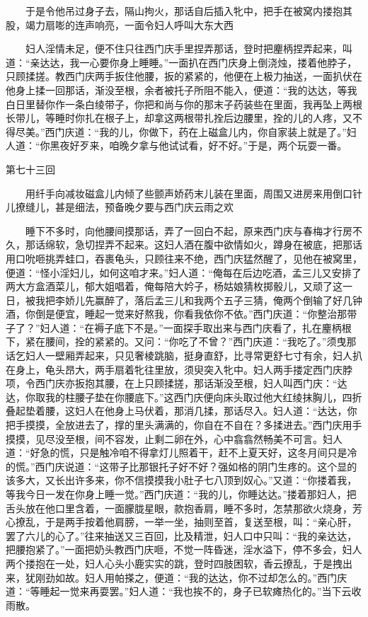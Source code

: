 　　于是令他吊过身子去，隔山拘火，那话自后插入牝中，把手在被窝内搂抱其股，竭力扇嘭的连声响亮，一面令妇人呼叫大东大西


　　妇人淫情未足，便不住只往西门庆手里捏弄那话，登时把麈柄捏弄起来，叫道：“亲达达，我一心要你身上睡睡。”一面扒在西门庆身上倒浇烛，搂着他脖子，只顾揉搓。教西门庆两手扳住他腰，扳的紧紧的，他便在上极力抽送，一面扒伏在他身上揉一回那话，渐没至根，余者被托子所阻不能入，便道：“我的达达，等我白日里替你作一条白绫带子，你把和尚与你的那末子药装些在里面，我再坠上两根长带儿，等睡时你扎在根子上，却拿这两根带扎拴后边腰里，拴的儿的人疼，又不得尽美。”西门庆道：“我的儿，你做下，药在上磁盒儿内，你自家装上就是了。”妇人道：“你黑夜好歹来，咱晚夕拿与他试试看，好不好。”于是，两个玩耍一番。


第七十三回

　　用纤手向减妆磁盒儿内倾了些颤声娇药末儿装在里面，周围又进房来用倒口针儿撩缝儿，甚是细法，预备晚夕要与西门庆云雨之欢


　　睡下不多时，向他腰间摸那话，弄了一回白不起，原来西门庆与春梅才行房不久，那话绵软，急切捏弄不起来。这妇人酒在腹中欲情如火，蹲身在被底，把那话用口吮咂挑弄蛙口，吞裹龟头，只顾往来不绝，西门庆猛然醒了，见他在被窝里，便道：“怪小淫妇儿，如何这咱才来。”妇人道：“俺每在后边吃酒，孟三儿又安排了两大方盒酒菜儿，郁大姐唱着，俺每陪大妗子，杨姑娘猜枚掷骰儿，又顽了这一日，被我把李娇儿先赢醉了，落后孟三儿和我两个五子三猜，俺两个倒输了好几钟酒，你倒是便宜，睡起一觉来好熬我，你看我依你不依。”西门庆道：“你整治那带子了？”妇人道：“在褥子底下不是。”一面探手取出来与西门庆看了，扎在麈柄根下，紧在腰间，拴的紧紧的。又问：“你吃了不曾？”西门庆道：“我吃了。”须曳那话乞妇人一壁厢弄起来，只见奢棱跳脑，挺身直舒，比寻常更舒七寸有余，妇人扒在身上，龟头昂大，两手扇着牝往里放，须臾突入牝中。妇人两手搂定西门庆脖项，令西门庆亦扳抱其腰，在上只顾揉搓，那话渐没至根，妇人叫西门庆：“达达，你取我的柱腰子垫在你腰底下。”这西门庆便向床头取过他大红绫抹胸儿，四折叠起垫着腰，这妇人在他身上马伏着，那消几揉，那话尽入。妇人道：“达达，你把手摸摸，全放进去了，撑的里头满满的，你自在不自在？多揉进去。”西门庆用手摸摸，见尽没至根，间不容发，止剩二卵在外，心中翕翕然畅美不可言。妇人道：“好急的慌，只是触冷咱不得拿灯儿照着干，赶不上夏天好，这冬月间只是冷的慌。”西门庆说道：“这带子比那银托子好不好？强如格的阴门生疼的。这个显的该多大，又长出许多来，你不信摸摸我小肚子七八顶到奴心。”又道：“你搂着我，等我今日一发在你身上睡一觉。”西门庆道：“我的儿，你睡达达。”搂着那妇人，把舌头放在他口里含着，一面朦胧星眼，款抱香肩，睡不多时，怎禁那欲火烧身，芳心撩乱，于是两手按着他肩膀，一举一坐，抽则至首，复送至根，叫：“亲心肝，罢了六儿的心了。”往来抽送又三百回，比及精泄，妇人口中只叫：“我的亲达达，把腰抱紧了。”一面把奶头教西门庆咂，不觉一阵昏迷，淫水溢下，停不多会，妇人两个搂抱在一处，妇人心头小鹿实实的跳，登时四肢困软，香云撩乱，于是拽出来，犹刚劲如故。妇人用帕搽之，便道：“我的达达，你不过却怎么的。”西门庆道：“等睡起一觉来再耍罢。”妇人道：“我也挨不的，身子已软瘫热化的。”当下云收雨散。


